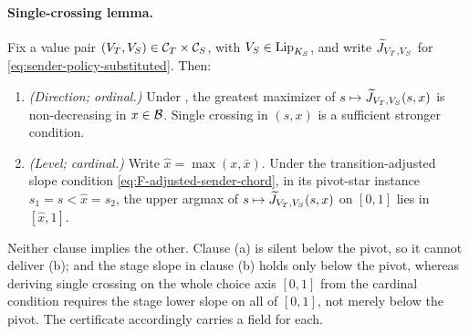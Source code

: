 \paragraph{Single-crossing lemma.}
\begin{lemma}
\label{lem:single-crossing}
Fix a value pair
$(V_T,V_S)\in\mathcal C_T\times\mathcal C_S$, with
$V_S\in\mathrm{Lip}_{K_S}$, and write
$\widetilde J_{V_T,V_S}$ for
\eqref{eq:sender-policy-substituted}. Then:
\begin{enumerate}[label=(\alph*)]
\item \emph{(Direction; ordinal.)} Under ,
the greatest maximizer of
$s\mapsto\widetilde J_{V_T,V_S}(s,x)$ is non-decreasing in
$x\in\mathcal{B}$. Single crossing in $(s,x)$ is a sufficient stronger
condition.
\item \emph{(Level; cardinal.)} Write $\hat x=\max(x,\bar x)$. Under the
transition-adjusted slope condition \eqref{eq:F-adjusted-sender-chord}, in its
pivot-star instance $s_1=s<\hat x=s_2$, the upper argmax of
$s\mapsto\widetilde J_{V_T,V_S}(s,x)$ on $[0,1]$ lies in $[\hat x,1]$.
\end{enumerate}
Neither clause implies the other. Clause (a) is silent below the
pivot, so it cannot deliver (b); and the stage slope in clause (b)
holds only below the pivot, whereas deriving single crossing on the
whole choice axis $[0,1]$ from the cardinal condition requires the stage
lower slope on all of $[0,1]$, not merely
below the pivot. The certificate accordingly carries a field for each.
\end{lemma}

